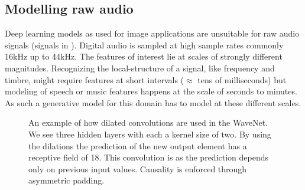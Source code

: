 \subsection{Modelling raw audio}
Deep learning models as used for image applications are unsuitable for raw audio signals (signals in ). Digital audio is sampled at high sample rates commonly 16kHz up to 44kHz. The features of interest lie at scales of strongly different magnitudes. Recognizing the local-structure of a signal, like frequency and timbre, might require features at short intervals (\(\approx\) tens of milliseconds) but modeling of speech or music features happens at the scale of seconds to minutes. As such a generative model for this domain has to model at these different scales.

\begin{figure}[]
    
    \caption{An example of how dilated convolutions are used in the WaveNet. We see three hidden layers with each a kernel size of two. By using the dilations the prediction of the new output element has a receptive field of 18. This convolution is  as the prediction depends only on previous input values. Causality is enforced through asymmetric padding.}
    \label{fig:wavenet}
\end{figure}

